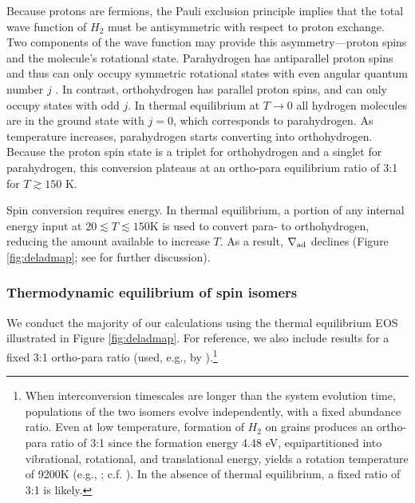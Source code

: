 Because protons are fermions, the Pauli exclusion principle implies that the total wave function of $H_2$ must be antisymmetric with respect to proton exchange.  Two components of the wave function may provide this asymmetry---proton spins and the molecule's rotational state. Parahydrogen has antiparallel proton spins and thus can only occupy symmetric rotational states with even angular quantum number $j$ \citep{farkas35}. In contrast, orthohydrogen has parallel proton spins, and can only occupy states with odd $j$. In thermal equilibrium at $T \rightarrow 0$ all hydrogen molecules are in the ground state with $j=0$, which corresponds to parahydrogen.  As temperature increases, parahydrogen starts converting into orthohydrogen.  Because the proton spin state is a triplet for orthohydrogen and a singlet for parahydrogen, this conversion plateaus at an ortho-para equilibrium ratio of 3:1 for $T \gtrsim 150$ K.
 
Spin conversion requires energy.  In thermal equilibrium, a portion of any internal energy input at $20 \lesssim T \lesssim 150$K is used to convert para- to orthohydrogen, reducing the amount available to increase $T$.  As a result, $\nabla_{\rm ad}$ declines (Figure \ref{fig:deladmap}; see  for further discussion). %
 
\subsubsection{Thermodynamic equilibrium of spin isomers}


We conduct the majority of our calculations using the thermal equilibrium EOS illustrated in Figure \ref{fig:deladmap}.  
For reference, we also include results for a fixed 3:1 ortho-para ratio (used, e.g., by \citealt{dangelo13}).\footnote{When interconversion timescales are longer than the system evolution time, populations of the two isomers evolve independently, with a fixed abundance ratio.  Even at low temperature, formation of $H_2$ on grains produces an ortho-para ratio of 3:1 since the formation energy 4.48 eV, equipartitioned into vibrational, rotational, and translational energy, yields a rotation temperature of 9200K
(e.g., \citealt{takahashi01}; c.f. \citealt{fukutani13}).  In the absence of thermal equilibrium, a fixed ratio of 3:1 is likely.}


